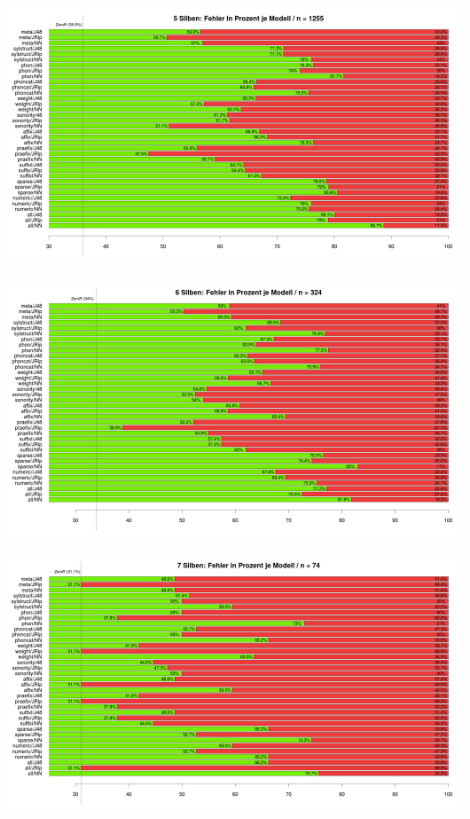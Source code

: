 \begin{center}{\includegraphics[width=12cm]{figures/basicstats/5syl-basicstats.png}}\end{center}
\begin{center}{\includegraphics[width=12cm]{figures/basicstats/6syl-basicstats.png}}\end{center}
\begin{center}{\includegraphics[width=12cm]{figures/basicstats/7syl-basicstats.png}}\end{center}
\newpage

